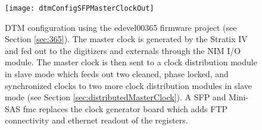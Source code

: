 \begin{figure}
\centering
\texttt{[image: dtmConfigSFPMasterClockOut]}
\caption{DTM configuration using the edevel00365 firmware project (see Section \ref{sec:365}). The master clock is generated by the Stratix IV and fed out to the digitizers and externals through the NIM I/O module. The master clock is then sent to a clock distribution module in slave mode which feeds out two cleaned, phase locked, and synchronized clocks to two more clock distribution modules in slave mode (see Section \ref{sec:distributedMasterClock}). A SFP and Mini-SAS \gls{fmc} replaces the clock generator board which adds FTP connectivity and ethernet readout of the registers.}
\label{Fig:dtmConfig365}
\end{figure}
